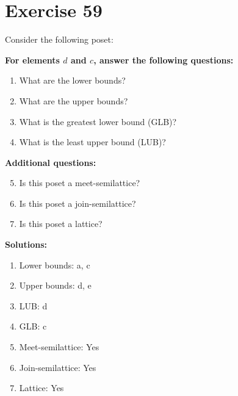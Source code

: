 \documentclass{article}
\begin{document}
\section*{Exercise 59}
Consider the following poset:
\begin{center}
\end{center}

    \textbf{For elements $d$ and $c$, answer the following questions:}
\begin{enumerate}
    \item What are the lower bounds?
    \item What are the upper bounds?
    \item What is the greatest lower bound (GLB)?
    \item What is the least upper bound (LUB)?
\end{enumerate}
    \hspace*{3ex} \textbf{Additional questions:}
\begin{enumerate}
    \setcounter{enumi}{4}
    \item Is this poset a meet-semilattice?
    \item Is this poset a join-semilattice?
    \item Is this poset a lattice?
\end{enumerate}

\textbf{Solutions:}
\begin{enumerate}
    \item Lower bounds: {a, c}
    \item Upper bounds: {d, e}
    \item LUB: d
    \item GLB: c
    \item Meet-semilattice: Yes
    \item Join-semilattice: Yes
    \item Lattice: Yes
\end{enumerate}
\newpage
\end{document}
